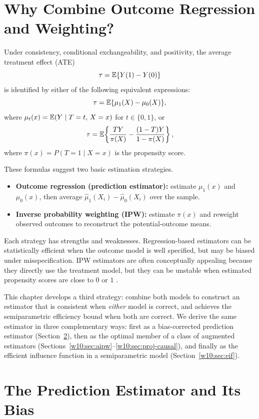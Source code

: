 \documentclass[master.tex]{subfiles}
\begin{document}
\section{Why Combine Outcome Regression and Weighting?}
\label{w10:sec:motivation}

Under consistency, conditional exchangeability, and positivity, the
average treatment effect (ATE)
\[
  \tau = \mathbb{E}\{Y(1) - Y(0)\}
\]
is identified by either of the following equivalent expressions:
\[
  \tau = \mathbb{E}\{\mu_1(X) - \mu_0(X)\},
\]
where $\mu_t(x) = \mathbb{E}(Y \mid T=t,\, X=x)$ for $t \in \{0,1\}$, or
\[
  \tau
  = \mathbb{E}\!\left\{
      \frac{TY}{\pi(X)} - \frac{(1-T)Y}{1-\pi(X)}
    \right\},
\]
where $\pi(x) = P(T=1 \mid X=x)$ is the propensity score.

These formulas suggest two basic estimation strategies.
\begin{itemize}
  \item \textbf{Outcome regression (prediction estimator):} estimate
    $\mu_1(x)$ and $\mu_0(x)$, then average
    $\hat\mu_1(X_i)-\hat\mu_0(X_i)$ over the sample.
  \item \textbf{Inverse probability weighting (IPW):} estimate
    $\pi(x)$ and reweight observed outcomes to reconstruct the
    potential-outcome means.
\end{itemize}

Each strategy has strengths and weaknesses.  Regression-based
estimators can be statistically efficient when the outcome model is
well specified, but may be biased under misspecification.  IPW
estimators are often conceptually appealing because they directly use
the treatment model, but they can be unstable when estimated
propensity scores are close to $0$ or $1$
\citep{rosenbaum1983central}.

This chapter develops a third strategy: combine both models to
construct an estimator that is consistent when \emph{either} model is
correct, and achieves the semiparametric efficiency bound when both
are correct.
We derive the same estimator in three complementary ways: first as a
bias-corrected prediction estimator
(Section~\ref{w10:sec:prediction}), then as the optimal member of a
class of augmented estimators (Sections~\ref{w10:sec:aipw}--\ref{w10:sec:proj-causal}),
and finally as the efficient influence function in a semiparametric
model (Section~\ref{w10:sec:eif}).

\section{The Prediction Estimator and Its Bias}
\label{w10:sec:prediction}
\end{document}

